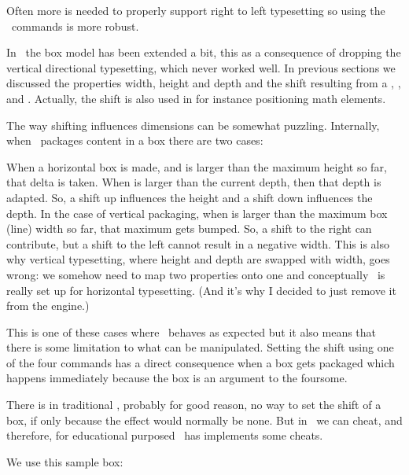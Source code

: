 \typebuffer[option=TEX]

\startlinecorrection
\getbuffer
\stoplinecorrection

Often more is needed to properly support right to left typesetting so using the
\CONTEXT\ commands is more robust.

In \LUAMETATEX\ the box model has been extended a bit, this as a consequence of
dropping the vertical directional typesetting, which never worked well. In
previous sections we discussed the properties width, height and depth and the
shift resulting from a \type {\raise}, \type {\lower}, \type {\moveleft} and
\type {\moveright}. Actually, the shift is also used in for instance positioning
math elements.

The way shifting influences dimensions can be somewhat puzzling. Internally, when
\TEX\ packages content in a box there are two cases:

\startitemize
    \startitem
        When a horizontal box is made, and  is larger than the
        maximum height so far, that delta is taken. When  is
        larger than the current depth, then that depth is adapted. So, a shift up
        influences the height and a shift down influences the depth.
    \stopitem
    \startitem
        In the case of vertical packaging, when  is larger
        than the maximum box (line) width so far, that maximum gets bumped. So, a
        shift to the right can contribute, but a shift to the left cannot result
        in a negative width. This is also why vertical typesetting, where height
        and depth are swapped with width, goes wrong: we somehow need to map two
        properties onto one and conceptually \TEX\ is really set up for
        horizontal typesetting. (And it's why I decided to just remove it from the
        engine.)
    \stopitem
\stopitemize

This is one of these cases where \TEX\ behaves as expected but it also means that
there is some limitation to what can be manipulated. Setting the shift using one
of the four commands has a direct consequence when a box gets packaged which
happens immediately because the box is an argument to the foursome.

There is in traditional \TEX, probably for good reason, no way to set the shift
of a box, if only because the effect would normally be none. But in \LUATEX\ we
can cheat, and therefore, for educational purposed \CONTEXT\ has implements
some cheats.

We use this sample box:


